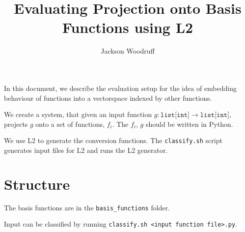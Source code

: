 \documentclass{article}
\begin{document}
\title{Evaluating Projection onto Basis Functions using L2}
\author{Jackson Woodruff}

\maketitle

In this document, we describe the evaluation setup for the idea
of embedding behaviour of functions into a vectorspace
indexed by other functions.

We create a system, that given an input function $g:\texttt{list[int]} \rightarrow \texttt{list[int]}$, projects $g$ onto a set of
functions, $f_i$.  The $f_i$, $g$ should be written in Python.

We use L2 to generate the conversion functions.  The
\texttt{classify.sh} script generates input files for L2 and
runs the L2 generator.

\section{Structure}
The basis functions are in the \texttt{basis\_functions} folder.

Input can be classified by running
\texttt{classify.sh <input function file>.py}.
\end{document}
